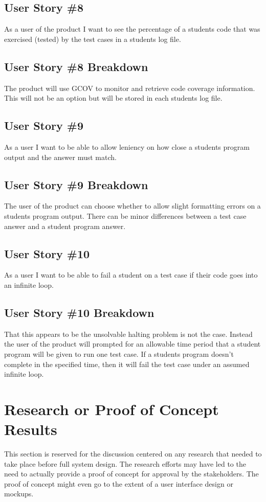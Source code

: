 \subsection{User Story \#8}
As a user of the product I want to see the percentage of a students code that was exercised (tested) by the test cases in a students log file.

\subsection{User Story \#8 Breakdown}
The product will use GCOV to monitor and retrieve code coverage information. This will not be an option but will be stored in each students log file.

\subsection{User Story \#9}
As a user I want to be able to allow leniency on how close a students program output and the answer must match.

\subsection{User Story \#9 Breakdown}
The user of the product can choose whether to allow slight formatting errors on a students program output. There can be minor differences between a test case answer and a student program answer.

\subsection{User Story \#10}
As a user I want to be able to fail a student on a test case if their code goes into an infinite loop.

\subsection{User Story \#10 Breakdown}
That this appears to be the unsolvable halting problem is not the case. Instead the user of the product will prompted for an allowable time period that a student program will be given to run one test case. If a students program doesn't complete in the specified time, then it will fail the test case under an assumed infinite loop.

\section{Research or Proof of Concept Results}
This section is reserved for the discussion centered on any research that needed 
to take place before full system design.  The research efforts may have led to 
the need to actually provide a proof of concept for approval by the stakeholders. 
 The proof of concept might even go to the extent of a user interface design or 
mockups.


